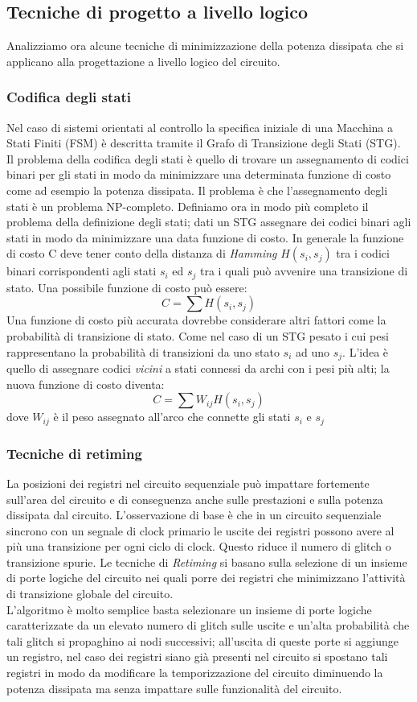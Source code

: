 \subsection{Tecniche di progetto a livello logico}
Analizziamo ora alcune tecniche di minimizzazione della potenza dissipata che si applicano alla progettazione a livello logico del circuito.
\subsubsection{Codifica degli stati}
Nel caso di sistemi orientati al controllo la specifica iniziale di una Macchina a Stati Finiti (FSM) è descritta tramite il Grafo di Transizione degli Stati (STG).
Il problema della codifica degli stati è quello di trovare un assegnamento di codici binari per gli stati in modo da minimizzare una determinata funzione di costo come ad esempio la potenza dissipata. Il problema è che l'assegnamento degli stati è un problema NP-completo.
Definiamo ora in modo più completo il problema della definizione degli stati; dati un STG assegnare dei codici binari agli stati in modo da minimizzare una data funzione di costo. In generale la funzione di costo C deve tener conto della distanza di \emph{Hamming} $H(s_i,s_j)$ tra i codici binari corrispondenti agli stati $s_i$ ed $s_j$ tra i quali può avvenire una transizione di stato. Una possibile funzione di costo può essere:
$$C=\sum H(s_i,s_j)$$
Una funzione di costo più accurata dovrebbe considerare altri fattori come la probabilità di transizione di stato. Come nel caso di un STG pesato i cui pesi rappresentano la probabilità di transizioni da uno stato $s_i$ ad uno $s_j$. L'idea è quello di assegnare codici \emph{vicini} a stati connessi da archi con i pesi più alti; la nuova funzione di costo diventa:
$$C = \sum W_{ij} H(s_i,s_j)$$
dove $W_{ij}$ è il peso assegnato all'arco che connette gli stati $s_i$ e $s_j$
\subsubsection{Tecniche di retiming}
La posizioni dei registri nel circuito sequenziale può impattare fortemente sull'area del circuito e di conseguenza anche sulle prestazioni e sulla potenza dissipata dal circuito. L'osservazione di base è che in un circuito sequenziale sincrono con un segnale di clock primario le uscite dei registri possono avere al più una transizione per ogni ciclo di clock. Questo riduce il numero di glitch o transizione spurie.
Le tecniche di \emph{Retiming} si basano sulla selezione di un insieme di porte logiche del circuito nei quali porre dei registri che minimizzano l'attività di transizione globale del circuito.\\
L'algoritmo è molto semplice basta selezionare un insieme di porte logiche caratterizzate da un elevato numero di glitch sulle uscite e un'alta probabilità che tali glitch si propaghino ai nodi successivi; all'uscita di queste porte si aggiunge un registro, nel caso dei registri siano già presenti nel circuito si spostano tali registri in modo da modificare la temporizzazione del circuito diminuendo la potenza dissipata ma senza impattare sulle funzionalità del circuito.

